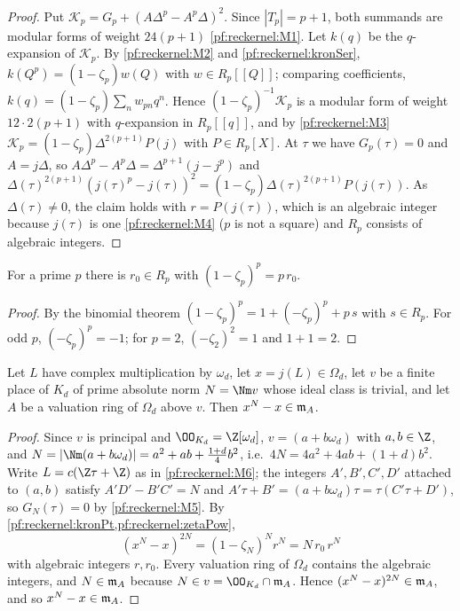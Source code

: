 \begin{proof}
Put $\mathcal K_p=G_p+(A\Delta^p-A^p\Delta)^2$. Since $|T_p|=p+1$, both summands are modular forms of weight
$24(p+1)$ \ref{pf:reckernel:M1}. Let $k(q)$ be the $q$-expansion of $\mathcal K_p$. By \ref{pf:reckernel:M2} and
\cref{pf:reckernel:kronSer}, $k(Q^p)=(1-\zeta_p)w(Q)$ with $w\in R_p[[Q]]$; comparing coefficients,
$k(q)=(1-\zeta_p)\sum_nw_{pn}q^n$. Hence $(1-\zeta_p)^{-1}\mathcal K_p$ is a modular form of weight $12\cdot2(p+1)$
with $q$-expansion in $R_p[[q]]$, and by \ref{pf:reckernel:M3}
$\mathcal K_p=(1-\zeta_p)\Delta^{2(p+1)}P(j)$ with $P\in R_p[X]$. At $\tau$ we have $G_p(\tau)=0$ and $A=j\Delta$,
so $A\Delta^p-A^p\Delta=\Delta^{p+1}(j-j^p)$ and
$\Delta(\tau)^{2(p+1)}(j(\tau)^p-j(\tau))^2=(1-\zeta_p)\Delta(\tau)^{2(p+1)}P(j(\tau))$. As $\Delta(\tau)\ne0$,
the claim holds with $r=P(j(\tau))$, which is an algebraic integer because $j(\tau)$ is one
\ref{pf:reckernel:M4} ($p$ is not a square) and $R_p$ consists of algebraic integers.
\end{proof}

\begin{lemma}\label{pf:reckernel:zetaPow}
For a prime $p$ there is $r_0\in R_p$ with $(1-\zeta_p)^p=p\,r_0$.
\end{lemma}

\begin{proof}
By the binomial theorem $(1-\zeta_p)^p=1+(-\zeta_p)^p+p\,s$ with $s\in R_p$. For odd $p$, $(-\zeta_p)^p=-1$; for
$p=2$, $(-\zeta_2)^2=1$ and $1+1=2$.
\end{proof}

\begin{lemma}\label{pf:reckernel:frobCong}
Let $L$ have complex multiplication by $\omega_d$, let $x=j(L)\in\Omega_d$, let $v$ be a finite place of $K_d$ of
prime absolute norm $N=\Nm v$ whose ideal class is trivial, and let $A$ be a valuation ring of $\Omega_d$ above
$v$. Then $x^N-x\in\mathfrak{m}_A$.
\end{lemma}

\begin{proof}
Since $v$ is principal and $\OO_{K_d}=\Z[\omega_d]$, $v=(a+b\omega_d)$ with $a,b\in\Z$, and
$N=|\Nm(a+b\omega_d)|=a^2+ab+\tfrac{1+d}{4}b^2$, i.e.\ $4N=4a^2+4ab+(1+d)b^2$. Write $L=c(\Z\tau+\Z)$ as in
\ref{pf:reckernel:M6}; the integers $A',B',C',D'$ attached to $(a,b)$ satisfy $A'D'-B'C'=N$ and
$A'\tau+B'=(a+b\omega_d)\tau=\tau(C'\tau+D')$, so $G_N(\tau)=0$ by \ref{pf:reckernel:M5}. By
\cref{pf:reckernel:kronPt,pf:reckernel:zetaPow},
\[
(x^N-x)^{2N}=(1-\zeta_N)^Nr^N=N\,r_0\,r^N
\]
with algebraic integers $r,r_0$. Every valuation ring of $\Omega_d$ contains the algebraic integers, and
$N\in\mathfrak{m}_A$ because $N\in v=\OO_{K_d}\cap\reckm_A$. Hence $(x^N-x)^{2N}\in\mathfrak{m}_A$, and so $x^N-x\in\mathfrak{m}_A$.
\end{proof}

